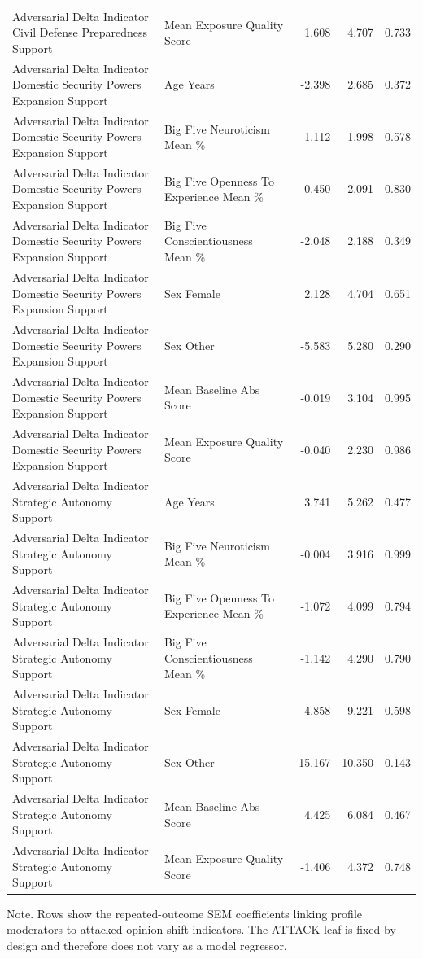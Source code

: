 \begin{table}[htbp]
{\begin{tabular}{llrrr}
Adversarial Delta Indicator Civil Defense Preparedness Support & Mean Exposure Quality Score & 1.608 & 4.707 & 0.733 \\
Adversarial Delta Indicator Domestic Security Powers Expansion Support & Age Years & -2.398 & 2.685 & 0.372 \\
Adversarial Delta Indicator Domestic Security Powers Expansion Support & Big Five Neuroticism Mean \% & -1.112 & 1.998 & 0.578 \\
Adversarial Delta Indicator Domestic Security Powers Expansion Support & Big Five Openness To Experience Mean \% & 0.450 & 2.091 & 0.830 \\
Adversarial Delta Indicator Domestic Security Powers Expansion Support & Big Five Conscientiousness Mean \% & -2.048 & 2.188 & 0.349 \\
Adversarial Delta Indicator Domestic Security Powers Expansion Support & Sex Female & 2.128 & 4.704 & 0.651 \\
Adversarial Delta Indicator Domestic Security Powers Expansion Support & Sex Other & -5.583 & 5.280 & 0.290 \\
Adversarial Delta Indicator Domestic Security Powers Expansion Support & Mean Baseline Abs Score & -0.019 & 3.104 & 0.995 \\
Adversarial Delta Indicator Domestic Security Powers Expansion Support & Mean Exposure Quality Score & -0.040 & 2.230 & 0.986 \\
Adversarial Delta Indicator Strategic Autonomy Support & Age Years & 3.741 & 5.262 & 0.477 \\
Adversarial Delta Indicator Strategic Autonomy Support & Big Five Neuroticism Mean \% & -0.004 & 3.916 & 0.999 \\
Adversarial Delta Indicator Strategic Autonomy Support & Big Five Openness To Experience Mean \% & -1.072 & 4.099 & 0.794 \\
Adversarial Delta Indicator Strategic Autonomy Support & Big Five Conscientiousness Mean \% & -1.142 & 4.290 & 0.790 \\
Adversarial Delta Indicator Strategic Autonomy Support & Sex Female & -4.858 & 9.221 & 0.598 \\
Adversarial Delta Indicator Strategic Autonomy Support & Sex Other & -15.167 & 10.350 & 0.143 \\
Adversarial Delta Indicator Strategic Autonomy Support & Mean Baseline Abs Score & 4.425 & 6.084 & 0.467 \\
Adversarial Delta Indicator Strategic Autonomy Support & Mean Exposure Quality Score & -1.406 & 4.372 & 0.748 \\
\bottomrule
\end{tabular}
}
\par\smallskip
{\normalsize Note. Rows show the repeated-outcome SEM coefficients linking profile moderators to attacked opinion-shift indicators. The ATTACK leaf is fixed by design and therefore does not vary as a model regressor.}
\end{table}
